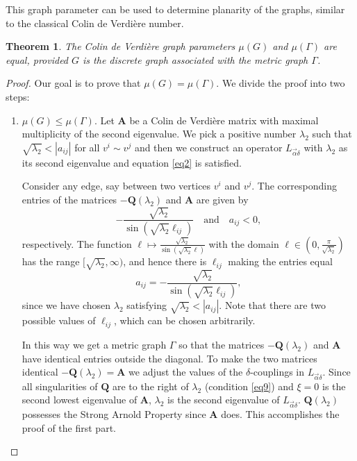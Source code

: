 \documentclass{amsart}
\newtheorem{theorem}{Theorem}[section]
\theoremstyle{definition}
\theoremstyle{remark}
\numberwithin{equation}{section}
\begin{document}
This graph parameter can be used to determine planarity of the graphs, similar to the
classical Colin de Verdi\` ere number.
 

\begin{theorem}  \label{ThST} The Colin de Verdi{\`e}re graph parameters $\mu(G)$ and $ \mu (\Gamma) $ are equal, 
provided $ G $ is the discrete graph associated with the metric graph $ \Gamma$.
\end{theorem}

\begin{proof}
Our goal is to prove that $ \mu(G) = \mu (\Gamma) $. We divide the proof into two steps:
\begin{enumerate}
\item $ \mu (G) \leq \mu (\Gamma) .$
Let $\mathbf{A}$ be a Colin de Verdi{\`e}re matrix with maximal multiplicity of the second eigenvalue. We pick a positive number $\lambda_2$ such that $\sqrt{\lambda_2}<|a_{ij}|$ for all $v^i\sim v^j$ and then we 
construct an operator $L_{\vec{\alpha} \delta}$ with $\lambda_2$ as its second eigenvalue and equation \eqref{eq2} is satisfied. 


Consider any edge, say between two vertices $ v^i $ and $ v^j $. The corresponding entries of the matrices $ - \mathbf Q (\lambda_2) $ and $ \mathbf A $ are given by
$$ -\frac{\sqrt{\lambda_2}}{\sin(\sqrt{\lambda_2} \ell_{ij})} \quad \mbox{and} \quad a_{ij} < 0,$$
respectively.
The function $ \ell \mapsto \frac{\sqrt{\lambda_2}}{\sin(\sqrt{\lambda_2} \ell )}$ with  the domain $\ell \in (0,\frac{\pi}{\sqrt{\lambda_2}})$ has the range $[\sqrt{\lambda_2},\infty)$, and  
hence there is $ \ell_{ij} $ making the entries equal
\begin{equation} \label{equal}
a_{ij} = -\frac{\sqrt{\lambda_2}}{\sin(\sqrt{\lambda_2} \ell_{ij})} ,
\end{equation}
 since we have chosen $ \lambda_2 $ satisfying $\sqrt{\lambda_2}<|a_{ij}|$.
Note that there are two possible values of $ \ell_{ij} $, which can be chosen arbitrarily.


In this way we get a metric graph $ \Gamma $ so that
the matrices $-\mathbf{Q}(\lambda_2)$ and $\mathbf{A}$ have identical entries outside the diagonal. 
To make the two matrices identical $-\mathbf{Q}(\lambda_2)=\mathbf{A}$
we adjust 
the values of  the $\delta$-couplings in $ L_{\vec{\alpha}\delta}$.
Since all singularities of $ \mathbf{Q}$ are to the right of $ \lambda_2$
(condition \eqref{eq9}) and $\xi=0$ is the second lowest eigenvalue of $\mathbf{A}$, $\lambda_2$ is the second eigenvalue of $ L_{\vec{\alpha} \delta}$. $ \mathbf{Q}(\lambda_2)$ possesses the Strong Arnold 
Property since $\mathbf{A}$ does. This accomplishes the proof of the first part.


\end{enumerate}
\end{proof}
\end{document}

